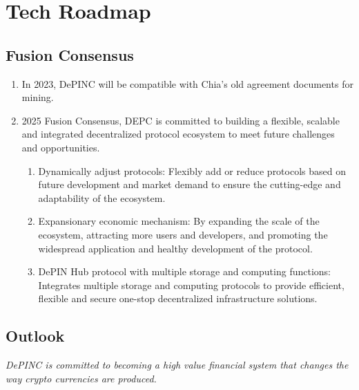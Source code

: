 \chapter{Tech Roadmap}
\section{Fusion Consensus}
\begin{enumerate}
    \item In 2023, DePINC will be compatible with Chia's old agreement documents for mining.
    \item 2025 Fusion Consensus, DEPC is committed to building a flexible, scalable and integrated decentralized protocol ecosystem to meet future challenges and opportunities.
    \begin{enumerate}
        \item Dynamically adjust protocols: Flexibly add or reduce protocols based on future development and market demand to ensure the cutting-edge and adaptability of the ecosystem.
        \item Expansionary economic mechanism: By expanding the scale of the ecosystem, attracting more users and developers, and promoting the widespread application and healthy development of the protocol.
        \item DePIN Hub protocol with multiple storage and computing functions: Integrates multiple storage and computing protocols to provide efficient, flexible and secure one-stop decentralized infrastructure solutions.
    \end{enumerate}
\end{enumerate}
\pagebreak
\section{Outlook}
\begin{flushleft}
    \textit{DePINC is committed to becoming a high value financial system that changes the way crypto currencies are produced.}
\end{flushleft}

